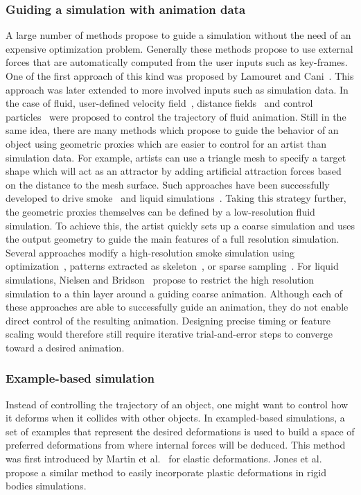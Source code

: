 \subsubsection{Guiding a simulation with animation data}
A large number of methods propose to guide a simulation without the need of an expensive optimization problem. 
Generally these methods propose to use external forces that are automatically computed from the user inputs such as key-frames.
One of the first approach of this kind was proposed by Lamouret and Cani~\cite{Lamouret1996}.
This approach was later extended to more involved inputs such as simulation data.
In the case of fluid, user-defined velocity field~\cite{Kim2006:SmokeControl}, distance fields~\cite{Yang2013} and control particles~\cite{Thurey2006:FluidControl,Madill2013} were proposed to control the trajectory of fluid animation.
Still in the same idea, there are many methods which propose to guide the behavior of an object using geometric proxies which are easier to control for an artist than simulation data. For example, artists can use a triangle mesh to specify a target shape which will act as an attractor by adding artificial attraction forces based on the distance to the mesh surface. 
Such approaches have been successfully developed to drive smoke~\cite{Fattal2004,Hong2004,Shi2005a} and liquid simulations~\cite{Shi2005b,Raveendran2012}.
Taking this strategy further, the geometric proxies themselves can be defined by a low-resolution fluid simulation. 
To achieve this, the artist quickly sets up a coarse simulation and uses the output geometry to guide the main features of a full resolution simulation.
Several approaches modify a high-resolution smoke simulation using optimization~\cite{Nielsen2009,Nielsen2010}, patterns extracted as skeleton~\cite{Yuan2011}, or sparse sampling~\cite{Huang2013}.
For liquid simulations, Nielsen and Bridson~\cite{Nielsen2011} propose to restrict the high resolution simulation to a thin layer around a guiding coarse animation.
Although each of these approaches are able to successfully guide an animation, they do not enable direct control of the resulting animation. Designing precise timing or feature scaling would therefore still require iterative trial-and-error steps to converge toward a desired animation.

\subsubsection{Example-based simulation}
Instead of controlling the trajectory of an object, one might want to control how it deforms when it collides with other objects. 
In exampled-based simulations, a set of examples that represent the desired deformations is used to build a space of preferred deformations from where internal forces will be deduced. This method was first introduced by Martin et al.~\cite{Martin2011} for elastic deformations. Jones et al.\cite{Jones2016} propose a similar method to easily incorporate plastic deformations in rigid bodies simulations.

